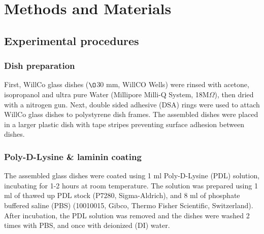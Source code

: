 \section{Methods and Materials}

\subsection{Experimental procedures}

\subsubsection{Dish preparation}
First, WillCo glass dishes ($\O$30 mm, WillCO Wells) were rinsed with acetone,
isopropanol and ultra pure Water (Millipore Milli-Q System, 18M$\Omega$), then
dried with a nitrogen gun. Next, double sided adhesive (DSA) rings were used to
attach WillCo glass dishes to polystyrene dish frames. The assembled dishes were
placed in a larger plastic dish with tape stripes preventing surface adhesion
between dishes.


\subsubsection{Poly-D-Lysine \& laminin coating}
The assembled glass dishes were coated using 1 ml Poly-D-Lysine (PDL) solution,
incubating for 1-2 hours at room temperature. The solution was prepared using 1
ml of thawed up PDL stock (P7280, Sigma-Aldrich), and 8 ml of phosphate buffered
saline (PBS) (10010015, Gibco, Thermo Fisher Scientific, Switzerland). After
incubation, the PDL solution was removed and the dishes were washed 2 times with
PBS, and once with deionized (DI) water. \\



